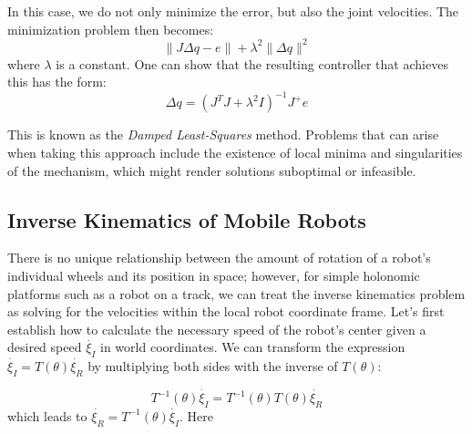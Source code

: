 In this case, we do not only minimize the error, but also the joint velocities. The minimization problem then becomes:
\begin{equation}
\|J\Delta q-e\|+\lambda^2\|\Delta q\|^2
\end{equation}
where $\lambda$ is a constant. One can show that the resulting controller that achieves this has the form:
\begin{equation}
\Delta q=(J^TJ+\lambda^2 I)^{-1}J^+e
\end{equation}

This is known as the \textsl{Damped Least-Squares} method. Problems that can arise when taking this approach include the existence of local minima and singularities of the mechanism, which might render solutions suboptimal or infeasible.

\subsection{Inverse Kinematics of Mobile Robots}\label{sec:kinematics:ik:mobile}

There is no unique relationship between the amount of rotation of a robot's individual wheels and its position in space; however, for simple holonomic platforms such as a robot on a track, we can treat the inverse kinematics problem as solving for the velocities within the local robot coordinate frame.
%
Let's first establish how to calculate the necessary speed of the robot's center given a desired speed $ \dot{\xi_I}$ in world coordinates. We can transform the expression $ \dot{\xi_I}=T(\theta)\dot{\xi_R}$ by multiplying both sides with the inverse of $ T(\theta)$:

\begin{equation}\label{eq:mbik}
T^{-1}(\theta)\dot{\xi_I}=T^{-1}(\theta)T(\theta)\dot{\xi_R}
\end{equation}
which leads to $ \dot{\xi_R}=T^{-1}(\theta)\dot{\xi_I}$. Here

